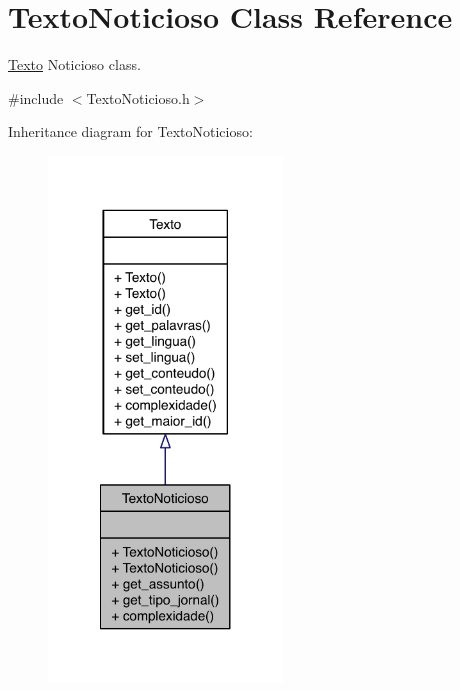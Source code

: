 \hypertarget{class_texto_noticioso}{\section{Texto\-Noticioso Class Reference}
\label{class_texto_noticioso}
}


\hyperlink{class_texto}{Texto} Noticioso class.  




{\ttfamily \#include $<$Texto\-Noticioso.\-h$>$}



Inheritance diagram for Texto\-Noticioso\-:
\nopagebreak
\begin{figure}[H]
\begin{center}
\leavevmode
\includegraphics[width=176pt]{class_texto_noticioso__inherit__graph}
\end{center}
\end{figure}


